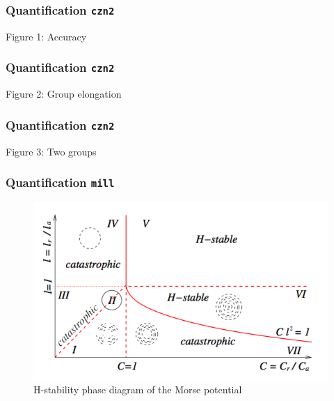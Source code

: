 \documentclass[compress]{beamer}
\begin{document}
\begin{frame}
	\frametitle{Quantification \texttt{czn2}}
Figure 1: Accuracy 
\end{frame}

\begin{frame}
	\frametitle{Quantification \texttt{czn2}}
	Figure 2: Group elongation 
\end{frame}

\begin{frame}
	\frametitle{Quantification \texttt{czn2}}
	Figure 3: Two groups
\end{frame}


\begin{frame}
	\frametitle{Quantification \texttt{mill}}
	
	\begin{figure}[H]
		\includegraphics[width=1.\columnwidth]{./img/H-stabilityPhaseDiagram.png}
		\caption{H-stability phase diagram of the Morse potential}
		\label{hstability}
	\end{figure}
	

\end{frame}
\end{document}
